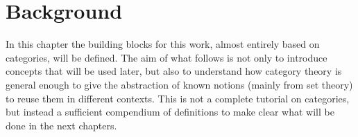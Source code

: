 \chapter{Background}\label{chap:one}

In this chapter the building blocks for this work, almost entirely based on categories, will be defined.
The aim of what follows is not only to introduce concepts that will be used later, but also to understand how category theory is general enough to give the abstraction of known notions (mainly from set theory) to reuse them in different contexts. This is not a complete tutorial on categories, but instead a sufficient compendium of definitions to make clear what will be done in the next chapters.




